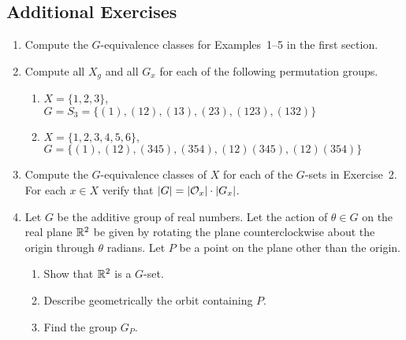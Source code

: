\begin{example}
 
 
\section*{Additional Exercises}
\exrule
 
 
 
 
{\small
\begin{enumerate}
 
 
\bf\item\rm
Compute the $G$-equivalence classes for Examples~1--5 in the first
section. 
 
 
\bf\item\rm 
Compute all $X_g$ and all $G_x$ for each of the following permutation
groups. 
\begin{enumerate}
 
 \bf\item\rm
$X= \{1, 2, 3\}$, \\
$G=S_3=\{(1), (12), (13), (23), (123), (132)  \}$
 
 \bf\item\rm
$X = \{1, 2, 3, 4, 5, 6\}$, \\
$G = \{(1), (12), (345), (354), (12)(345), (12)(354)  \}$
 
\end{enumerate}
 
 
\bf\item\rm
Compute the $G$-equivalence classes of $X$ for each of the $G$-sets in
Exercise~2. For each $x \in X$ verify that $|G|=|{\cal O}_x| \cdot
|G_x|$.  
 
 
\bf\item\rm
Let $G$ be the additive group of real numbers. Let the action of
$\theta \in G$ on the real plane ${\Bbb R}^2$ be given by rotating the
plane counterclockwise about the origin through $\theta$ radians. Let
$P$ be a point on the plane other than the origin.
\begin{enumerate}
 
 \bf\item\rm
Show that ${\Bbb R}^2$ is a $G$-set.
 
 \bf\item\rm
Describe geometrically the orbit containing $P$.
 
 \bf\item\rm
Find the group $G_P$.
 
\end{enumerate}
 

\end{enumerate}}
\end{example}
